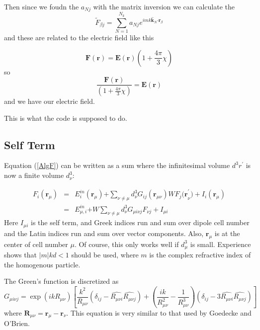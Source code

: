 \documentclass{article}
\begin{document}
Then since we foudn the $a_{Nj}$ with the matrix inversion we can calculate
the 
\begin{equation}
\tilde{F}_{\beta j}\mathbf{=}\sum_{N=1}^{N_{k}}a_{Nj}e^{imk\mathbf{\hat{k}}%
_{N}\mathbf{\cdot r}_{\beta }}
\end{equation}%
and these are related to the electric field like this

\[
\mathbf{F}(\mathbf{r})=\mathbf{E}(\mathbf{r})(1+\frac{4\pi }{3}\chi ) 
\]%
so 
\[
\frac{\mathbf{F}(\mathbf{r})}{(1+\frac{4\pi }{3}\chi )}=\mathbf{E}(\mathbf{r}%
) 
\]%
and we have our electric field.

This is what the code is supposed to do.

\subsection{Self Term}

Equation (\ref{AlgF}) can be written as a sum where the infinitesimal volume 
$d^{3}r^{\prime }$ is now a finite volume $d_{\nu }^{3}$:

\begin{eqnarray}
F_{i}(\mathbf{r}_{\mu }) &=&E_{i}^{in}\left( \mathbf{r}_{\mu }\right) 
\mathbf{+}\sum\limits_{\nu \neq \mu }d_{\nu }^{3}G_{ij}\left( \mathbf{r}%
_{\mu \nu }\right) WF_{j}\mathbf{(r}_{\nu }^{\prime })+I_{i}(\mathbf{r}_{\mu
}) \\
&=&E_{\mu ,i}^{in}\mathbf{+}W\sum\limits_{\nu \neq \mu }d_{\nu }^{3}G_{\mu
i\nu j}F_{\nu j}+I_{\mu i}  \nonumber
\end{eqnarray}%
Here $I_{\mu i}$ is the self term, and Greek indices run and sum over dipole
cell number and the Latin indices run and sum over vector components. Also, $%
\mathbf{r}_{\mu }$ is at the center of cell number $\mu .$ Of course, this
only works well if $d_{\mu }^{3}$ is small. Experience shows that $%
\left\vert m\right\vert kd<1$ should be used, where $m$ is the complex
refractive index of the homogenous particle.

The Green's function is discretized as 
\begin{equation}
G_{\mu i\nu j}=\exp (ikR_{\mu \nu })\left[ \frac{k^{2}}{R_{\mu \nu }}\left(
\delta _{ij}-\widehat{R_{\mu \nu i}}\widehat{R_{\mu \nu j}}\right) +\left( 
\frac{ik}{R_{\mu \nu }^{2}}-\frac{1}{R_{\mu \nu }^{3}}\right) \left( \delta
_{ij}-3\widehat{R_{\mu \nu i}}\widehat{R_{\mu \nu j}}\right) \right]
\end{equation}
where $\mathbf{R}_{\mu \nu }=\mathbf{r}_{\mu }-\mathbf{r}_{\nu }.$ This
equation is very similar to that used by Goedecke and O'Brien.\cite%
{Goedecke88}
\end{document}
